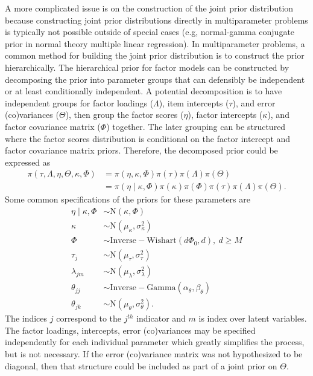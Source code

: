 \documentclass[man, noextraspace, floatsintext, 12pt]{apa7}
\begin{document}
A more complicated issue is on the construction of the joint prior distribution because constructing joint prior distributions directly in multiparameter problems is typically not possible outside of special cases (e.g, normal-gamma conjugate prior in normal theory multiple linear regression).
In multiparameter problems, a common method for building the joint prior distribution is to construct the prior hierarchically.
The hierarchical prior for factor models can be constructed by decomposing the prior into parameter groups that can defensibly be independent or at least conditionally independent.
A potential decomposition is to have independent groups for factor loadings ($\Lambda$), item intercepts ($\tau$), and error (co)variances ($\Theta$), then group the factor scores ($\eta$), factor intercepts ($\kappa$), and factor covariance matrix ($\Phi$) together.
The later grouping can be structured where the factor scores distribution is conditional on the factor intercept and factor covariance matrix priors.
Therefore, the decomposed prior could be expressed as
\begin{align*}
\pi\left(\tau, \Lambda, \eta,\Theta, \kappa, \Phi\right) &= \pi\left(\eta, \kappa, \Phi\right)\pi\left(\tau\right)\pi\left(\Lambda\right) \pi\left(\Theta\right)\\
&= \pi\left(\eta\mid \kappa, \Phi\right) \pi\left(\kappa\right)  \pi\left(\Phi\right) \pi\left(\tau\right)\pi\left(\Lambda\right) \pi\left(\Theta\right).
\end{align*}
Some common specifications of the priors for these parameters are
\begin{align*}
\eta\mid \kappa, \Phi &\sim \mathrm{N}(\kappa,\Phi)\\
\kappa &\sim \mathrm{N}(\mu_{\kappa}, \sigma^2_{\kappa})\\
\Phi &\sim \mathrm{Inverse-Wishart}(d\Phi_0, d),\ d \geq M\\
\tau_{j} &\sim \mathrm{N}(\mu_{\tau}, \sigma^2_{\tau})\\
\lambda_{jm} &\sim \mathrm{N}(\mu_{\lambda}, \sigma^2_{\lambda})\\
\theta_{jj} &\sim \mathrm{Inverse-Gamma}(\alpha_{\theta}, \beta_{\theta})\\
\theta_{jk} &\sim \mathrm{N}(\mu_{\theta}, \sigma^2_{\theta}).
\end{align*}
The indices $j$ correspond to the $j^{th}$ indicator and $m$ is index over latent variables.
The factor loadings, intercepts, error (co)variances may be specified independently for each individual parameter which greatly simplifies the process, but is not necessary.
If the error (co)variance matrix was not hypothesized to be diagonal, then that structure could be included as part of a joint prior on $\Theta$.
\end{document}
